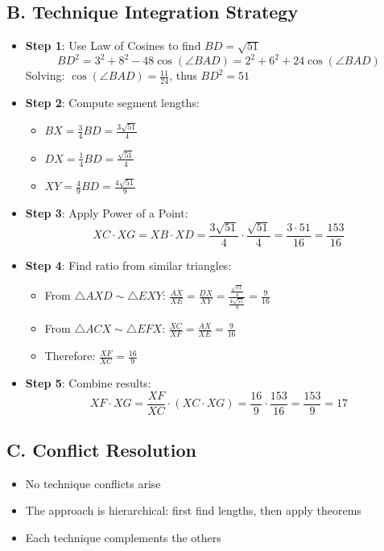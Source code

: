 \documentclass[]{article}
\begin{document}
\begin{techniquesbox}
\subsection*{B. Technique Integration Strategy}
\begin{itemize}[leftmargin=*]
    \item \textbf{Step 1}: Use Law of Cosines to find $BD = \sqrt{51}$
    \[BD^2 = 3^2 + 8^2 - 48\cos(\angle BAD) = 2^2 + 6^2 + 24\cos(\angle BAD)\]
    Solving: $\cos(\angle BAD) = \frac{11}{24}$, thus $BD^2 = 51$
    
    \item \textbf{Step 2}: Compute segment lengths:
    \begin{itemize}
        \item $BX = \frac{3}{4}BD = \frac{3\sqrt{51}}{4}$
        \item $DX = \frac{1}{4}BD = \frac{\sqrt{51}}{4}$
        \item $XY = \frac{4}{9}BD = \frac{4\sqrt{51}}{9}$
    \end{itemize}
    
    \item \textbf{Step 3}: Apply Power of a Point:
    \[XC \cdot XG = XB \cdot XD = \frac{3\sqrt{51}}{4} \cdot \frac{\sqrt{51}}{4} = \frac{3 \cdot 51}{16} = \frac{153}{16}\]
    
    \item \textbf{Step 4}: Find ratio from similar triangles:
    \begin{itemize}
        \item From $\triangle AXD \sim \triangle EXY$: $\frac{AX}{XE} = \frac{DX}{XY} = \frac{\frac{\sqrt{51}}{4}}{\frac{4\sqrt{51}}{9}} = \frac{9}{16}$
        \item From $\triangle ACX \sim \triangle EFX$: $\frac{XC}{XF} = \frac{AX}{XE} = \frac{9}{16}$
        \item Therefore: $\frac{XF}{XC} = \frac{16}{9}$
    \end{itemize}
    
    \item \textbf{Step 5}: Combine results:
    \[XF \cdot XG = \frac{XF}{XC} \cdot (XC \cdot XG) = \frac{16}{9} \cdot \frac{153}{16} = \frac{153}{9} = 17\]
\end{itemize}

\subsection*{C. Conflict Resolution}
\begin{itemize}[leftmargin=*]
    \item No technique conflicts arise
    \item The approach is hierarchical: first find lengths, then apply theorems
    \item Each technique complements the others
\end{itemize}
\end{techniquesbox}
\end{document}
